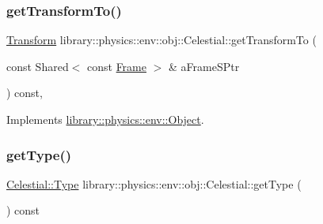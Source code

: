 \mbox{\label{classlibrary_1_1physics_1_1env_1_1obj_1_1_celestial_ac6676b10ebbb63a8483137c9c734c58a}} 
\subsubsection{\texorpdfstring{get\+Transform\+To()}{getTransformTo()}}
{\footnotesize\ttfamily \hyperlink{classlibrary_1_1physics_1_1coord_1_1_transform}{Transform} library\+::physics\+::env\+::obj\+::\+Celestial\+::get\+Transform\+To (\begin{DoxyParamCaption}\item[{const Shared$<$ const \hyperlink{classlibrary_1_1physics_1_1coord_1_1_frame}{Frame} $>$ \&}]{a\+Frame\+S\+Ptr }\end{DoxyParamCaption}) const\hspace{0.3cm}{\ttfamily [override]}, {\ttfamily [virtual]}}



Implements \hyperlink{classlibrary_1_1physics_1_1env_1_1_object_abe850e2334c19ae185456cd52aeeca7d}{library\+::physics\+::env\+::\+Object}.

\mbox{\label{classlibrary_1_1physics_1_1env_1_1obj_1_1_celestial_ae020ad574249ea82679347c0a6933355}} 
\subsubsection{\texorpdfstring{get\+Type()}{getType()}}
{\footnotesize\ttfamily \hyperlink{classlibrary_1_1physics_1_1env_1_1obj_1_1_celestial_aab1f58aa727e639288d65f3d33c4f245}{Celestial\+::\+Type} library\+::physics\+::env\+::obj\+::\+Celestial\+::get\+Type (\begin{DoxyParamCaption}{ }\end{DoxyParamCaption}) const}

